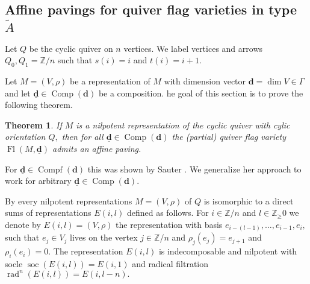 \documentclass{amsart}
\theoremstyle{plain}
\newtheorem{theorem}{Theorem}[section]
\theoremstyle{TheoremNum}
\theoremstyle{definition}
\theoremstyle{remark}
\numberwithin{equation}{section}
\newcommand{\Z}{\mathbb{Z}}
\newcommand{\Fl}{\operatorname{Fl}}
\newcommand{\soc}{\operatorname{soc}}
\newcommand{\rad}{\operatorname{rad}}
\newcommand{\Comp}{\operatorname{Comp}}
\newcommand{\Compf}{\operatorname{Compf}}
\begin{document}
\subsection{Affine pavings for quiver flag varieties in type $\widetilde{A}$}\label{sec:cyclicquiver}
Let $Q$ be the cyclic quiver on $n$ vertices. We label vertices and arrows $Q_0,Q_1=\Z/n$ such that $s(i)=i$ and $t(i)=i+1.$

Let $M=(V,\rho)$ be a representation of $M$ with dimension vector $\mathbf{d}=\dim V\in \Gamma$ and let $\underline{\mathbf{d}}\in\Comp(\mathbf{d})$ be a composition. he goal of this section is to prove the following theorem.
\begin{theorem}\label{thm:cylicquiverflagpaving}
If $M$ is a nilpotent representation of the cyclic quiver with cylic orientation $Q,$ then for all $\underline{\mathbf{d}}\in\Comp(\mathbf{d})$ the (partial) quiver flag variety $\Fl(M,\underline{\mathbf{d}})$ admits an affine paving.
\end{theorem}
For $\underline{\mathbf{d}}\in\Compf(\mathbf{d})$ this was shown by Sauter \cite{sauter_cell_2016}. We generalize her approach to work for arbitrary $\underline{\mathbf{d}}\in\Comp(\mathbf{d}).$

By \cite[Proposition 3.24]{schiffmann_lectures_2012} every  nilpotent representations $M=(V,\rho)$ of $Q$ is isomorphic to a direct sums of representations $E(i,l)$ defined as follows.
For $i\in \Z/n$ and $l\in \Z_\geq{0}$ we denote by $E(i,l)=(V,\rho)$ the representation with basis $e_{i-(l-1)},\dots,e_{i-1},e_i,$ such that $e_j\in V_j$ lives on the vertex $j\in\Z/n$ and $\rho_j(e_j)=e_{j+1}$ and $\rho_i(e_i)=0.$ The representation $E(i,l)$ is indecomposable and nilpotent with socle $\soc(E(i,l))=E(i,1)$ and radical filtration $\rad^n(E(i,l))=E(i,l-n).$
\end{document}

